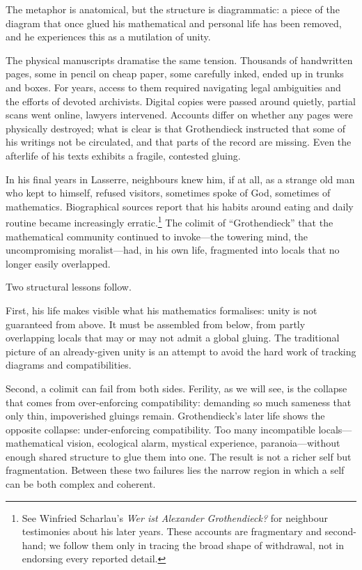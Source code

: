 \documentclass[12pt,a4paper]{article}
\begin{document}
The metaphor is anatomical, but the structure is diagrammatic: a piece of the diagram that once glued his mathematical and personal life has been removed, and he experiences this as a mutilation of unity.

The physical manuscripts dramatise the same tension. Thousands of handwritten pages, some in pencil on cheap paper, some carefully inked, ended up in trunks and boxes. For years, access to them required navigating legal ambiguities and the efforts of devoted archivists. Digital copies were passed around quietly, partial scans went online, lawyers intervened. Accounts differ on whether any pages were physically destroyed; what is clear is that Grothendieck instructed that some of his writings not be circulated, and that parts of the record are missing. Even the afterlife of his texts exhibits a fragile, contested gluing.

In his final years in Lasserre, neighbours knew him, if at all, as a strange old man who kept to himself, refused visitors, sometimes spoke of God, sometimes of mathematics. Biographical sources report that his habits around eating and daily routine became increasingly erratic.\footnote{See Winfried Scharlau's \emph{Wer ist Alexander Grothendieck?} for neighbour testimonies about his later years. These accounts are fragmentary and second-hand; we follow them only in tracing the broad shape of withdrawal, not in endorsing every reported detail.} The colimit of ``Grothendieck'' that the mathematical community continued to invoke---the towering mind, the uncompromising moralist---had, in his own life, fragmented into locals that no longer easily overlapped.

Two structural lessons follow.

First, his life makes visible what his mathematics formalises: unity is not guaranteed from above. It must be assembled from below, from partly overlapping locals that may or may not admit a global gluing. The traditional picture of an already-given unity is an attempt to avoid the hard work of tracking diagrams and compatibilities.

Second, a colimit can fail from both sides. Ferility, as we will see, is the collapse that comes from over-enforcing compatibility: demanding so much sameness that only thin, impoverished gluings remain. Grothendieck's later life shows the opposite collapse: under-enforcing compatibility. Too many incompatible locals---mathematical vision, ecological alarm, mystical experience, paranoia---without enough shared structure to glue them into one. The result is not a richer self but fragmentation. Between these two failures lies the narrow region in which a self can be both complex and coherent.
\end{document}
